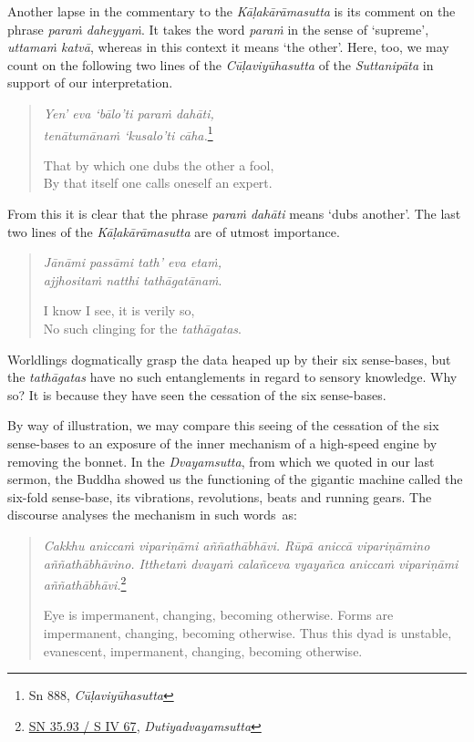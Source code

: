 Another lapse in the commentary to the \emph{Kāḷakārāmasutta} is its comment on the phrase \emph{paraṁ daheyyaṁ}. It takes the word \emph{paraṁ} in the sense of `supreme', \emph{uttamaṁ katvā}, whereas in this context it means `the other'. Here, too, we may count on the following two lines of the \emph{Cūḷaviyūhasutta} of the \emph{Suttanipāta} in support of our interpretation.

\begin{quote}
\emph{Yen' eva `bālo'ti paraṁ dahāti,}\\
\emph{tenātumānaṁ `kusalo'ti cāha.}\footnote{Sn 888, \emph{Cūḷaviyūhasutta}}

That by which one dubs the other a fool,\\
By that itself one calls oneself an expert.
\end{quote}

From this it is clear that the phrase \emph{paraṁ dahāti} means `dubs another'. The last two lines of the \emph{Kāḷakārāmasutta} are of utmost importance.

\begin{quote}
\emph{Jānāmi passāmi tath' eva etaṁ,}\\
\emph{ajjhositaṁ natthi tathāgatānaṁ}.

I know I see, it is verily so,\\
No such clinging for the \emph{tathāgatas}.
\end{quote}

Worldlings dogmatically grasp the data heaped up by their six sense-bases, but the \emph{tathāgatas} have no such entanglements in regard to sensory knowledge. Why so? It is because they have seen the cessation of the six sense-bases.

By way of illustration, we may compare this seeing of the cessation of the six sense-bases to an exposure of the inner mechanism of a high-speed engine by removing the bonnet. In the \emph{Dvayamsutta}, from which we quoted in our last sermon, the Buddha showed us the functioning of the gigantic machine called the six-fold sense-base, its vibrations, revolutions, beats and running gears. The discourse analyses the mechanism in such words~as:

\begin{quote}
\emph{Cakkhu aniccaṁ vipariṇāmi aññathābhāvi. Rūpā aniccā vipariṇāmino aññathābhāvino. Itthetaṁ dvayaṁ calañceva vyayañca aniccaṁ vipariṇāmi aññathābhāvi.}\footnote{\href{https://suttacentral.net/sn35.93/pli/ms}{SN 35.93 / S IV 67}, \emph{Dutiyadvayamsutta}}

Eye is impermanent, changing, becoming otherwise. Forms are impermanent, changing, becoming otherwise. Thus this dyad is unstable, evanescent, impermanent, changing, becoming otherwise.
\end{quote}

